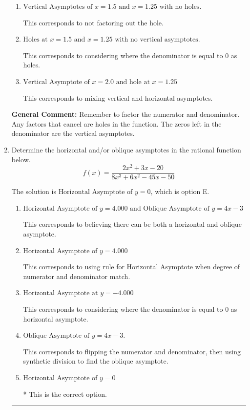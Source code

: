 \documentclass{extbook}[14pt]
\newcommand{\litem}[1]{\item #1

\rule{\textwidth}{0.4pt}}
\begin{document}
\begin{enumerate}
{\begin{enumerate}[label=\Alph*.]
This is the correct answer.
\item \( \text{Vertical Asymptotes of } x = 1.5 \text{ and } x = 1.25 \text{ with no holes.} \)

This corresponds to not factoring out the hole.
\item \( \text{Holes at } x = 1.5 \text{ and } x = 1.25 \text{ with no vertical asymptotes.} \)

This corresponds to considering where the denominator is equal to 0 as holes.
\item \( \text{Vertical Asymptote of } x = 2.0 \text{ and hole at } x = 1.25 \)

This corresponds to mixing vertical and horizontal asymptotes.
\end{enumerate}

\textbf{General Comment:} Remember to factor the numerator and denominator. Any factors that cancel are holes in the function. The zeros left in the denominator are the vertical asymptotes.
}
\litem{
Determine the horizontal and/or oblique asymptotes in the rational function below.
\[ f(x) = \frac{2x^{2} +3 x -20}{8x^{3} +6 x^{2} -45 x -50} \]

The solution is \( \text{Horizontal Asymptote of } y = 0 \), which is option E.\begin{enumerate}[label=\Alph*.]
\item \( \text{Horizontal Asymptote of } y = 4.000 \text{ and Oblique Asymptote of } y = 4x -3 \)

This corresponds to believing there can be both a horizontal and oblique asymptote.
\item \( \text{Horizontal Asymptote of } y = 4.000  \)

This corresponds to using rule for Horizontal Asymptote when degree of numerator and denominator match.
\item \( \text{Horizontal Asymptote at } y = -4.000 \)

This corresponds to considering where the denominator is equal to 0 as horizontal asymptote.
\item \( \text{Oblique Asymptote of } y = 4x -3. \)

This corresponds to flipping the numerator and denominator, then using synthetic division to find the oblique asymptote.
\item \( \text{Horizontal Asymptote of } y = 0 \)

* This is the correct option.
\end{enumerate}

}
\end{enumerate}
\end{document}
